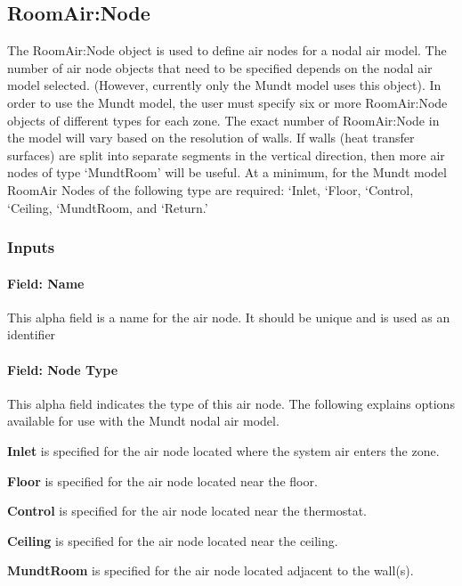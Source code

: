 \subsection{RoomAir:Node}\label{roomairnode}

The RoomAir:Node object is used to define air nodes for a nodal air model. The number of air node objects that need to be specified depends on the nodal air model selected. (However, currently only the Mundt model uses this object). In order to use the Mundt model, the user must specify six or more RoomAir:Node objects of different types for each zone. The exact number of RoomAir:Node in the model will vary based on the resolution of walls. If walls (heat transfer surfaces) are split into separate segments in the vertical direction, then more air nodes of type `MundtRoom' will be useful. At a minimum, for the Mundt model RoomAir Nodes of the following type are required: `Inlet, `Floor, `Control, `Ceiling, `MundtRoom, and `Return.'

\subsubsection{Inputs}\label{inputs-6-022}

\paragraph{Field: Name}\label{field-name-6-018}

This alpha field is a name for the air node. It should be unique and is used as an identifier

\paragraph{Field: Node Type}\label{field-node-type}

This alpha field indicates the type of this air node. The following explains options available for use with the Mundt nodal air model.

\textbf{Inlet} is specified for the air node located where the system air enters the zone.

\textbf{Floor} is specified for the air node located near the floor.

\textbf{Control} is specified for the air node located near the thermostat.

\textbf{Ceiling} is specified for the air node located near the ceiling.

\textbf{MundtRoom} is specified for the air node located adjacent to the wall(s).

